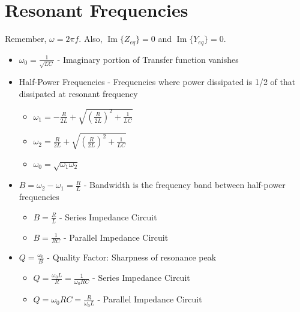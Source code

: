 \documentclass[10pt,letterpaper,final,twoside,notitlepage]{article}
\renewcommand{\Im}{\operatorname{Im}} %
\begin{document}
\section*{Resonant Frequencies} \label{sec:Frequency Resonance}
Remember, $\omega = 2 \pi f$.
Also, $\Im \lbrace Z_{eq} \rbrace = 0$ and $\Im \lbrace Y_{eq} \rbrace = 0$.
\begin{itemize}[nolistsep]
	\item $\omega_{0} = \frac{1}{\sqrt{LC}}$ - Imaginary portion of Transfer function vanishes
	\item Half-Power Frequencies - Frequencies where power dissipated is 1/2 of that dissipated at resonant frequency
	\begin{itemize}[noitemsep]
		\item $\omega_{1} = - \frac{R}{2L} + \sqrt{\left( \frac{R}{2L} \right)^{2} + \frac{1}{LC}}$
		\item $\omega_{2} = \frac{R}{2L} + \sqrt{\left( \frac{R}{2L} \right)^{2} + \frac{1}{LC}}$
		\item $\omega_{0} = \sqrt{\omega_{1}\omega_{2}}$
	\end{itemize}
	\item $B = \omega_{2} - \omega_{1} = \frac{R}{L}$ - Bandwidth is the frequency band between half-power frequencies
	\begin{itemize}[noitemsep]
		\item $B = \frac{R}{L}$ - Series Impedance Circuit
		\item $B = \frac{1}{RC}$ - Parallel Impedance Circuit
	\end{itemize}
	\item $Q = \frac{\omega_{0}}{B}$ - Quality Factor: Sharpness of resonance peak
	\begin{itemize}[noitemsep]
		\item $Q =\frac{\omega_{0}L}{R} = \frac{1}{\omega_{0}RC}$ - Series Impedance Circuit
		\item $Q = \omega_{0}RC = \frac{R}{\omega_{0}L}$ - Parallel Impedance Circuit
	\end{itemize}
\end{itemize}
\end{document}
